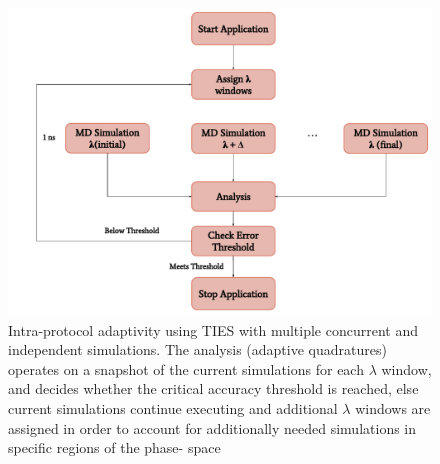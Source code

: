 \begin{figure}
  \centering
  \includegraphics[width=\columnwidth]{figures/adaptive_TIES_workflow_diagram.pdf}
  \caption{Intra-protocol adaptivity using TIES with multiple concurrent and 
  independent simulations. The analysis (adaptive quadratures) operates on a 
  snapshot of the current simulations for each $\lambda$ window, and decides 
  whether the critical accuracy threshold is reached, else current simulations 
  continue executing and additional $\lambda$ windows are assigned in order to 
  account for additionally needed simulations in specific regions of the phase-
  space}
\label{fig:adaptive_ties}
\end{figure}

